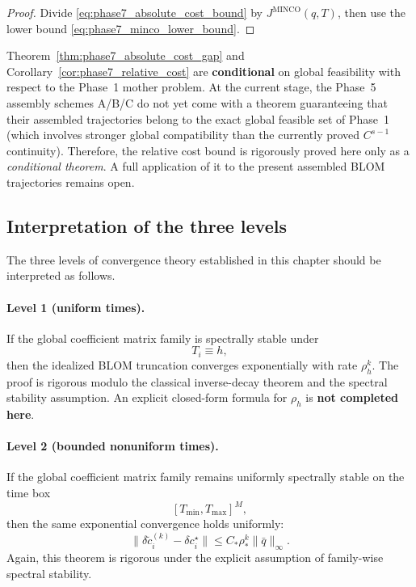 \begin{proof}
	Divide \eqref{eq:phase7_absolute_cost_bound} by \(J^{\mathrm{MINCO}}(q,T)\), then use the lower bound \eqref{eq:phase7_minco_lower_bound}.
\end{proof}

\begin{remark}
	\label{rem:phase7_cost_limitation}
	Theorem~\ref{thm:phase7_absolute_cost_gap} and Corollary~\ref{cor:phase7_relative_cost} are \textbf{conditional} on global feasibility with respect to the Phase~1 mother problem.
	At the current stage, the Phase~5 assembly schemes A/B/C do not yet come with a theorem guaranteeing that their assembled trajectories belong to the exact global feasible set of Phase~1 (which involves stronger global compatibility than the currently proved \(C^{s-1}\) continuity).
	Therefore, the relative cost bound is rigorously proved here only as a \emph{conditional theorem}.
	A full application of it to the present assembled BLOM trajectories remains open.
\end{remark}

\subsection{Interpretation of the three levels}
\label{subsec:phase7_interpretation}

The three levels of convergence theory established in this chapter should be interpreted as follows.

\paragraph{Level 1 (uniform times).}
If the global coefficient matrix family is spectrally stable under
\[
T_i\equiv h,
\]
then the idealized BLOM truncation converges exponentially with rate \(\rho_h^k\).
The proof is rigorous modulo the classical inverse-decay theorem and the spectral stability assumption.
An explicit closed-form formula for \(\rho_h\) is \textbf{not completed here}.

\paragraph{Level 2 (bounded nonuniform times).}
If the global coefficient matrix family remains uniformly spectrally stable on the time box
\[
[T_{\min},T_{\max}]^M,
\]
then the same exponential convergence holds uniformly:
\[
\bigl\|
\delta \tilde c_i^{(k)}-\delta c_i^\star
\bigr\|
\le
C_\ast \rho_\ast^k \|\bar q\|_\infty.
\]
Again, this theorem is rigorous under the explicit assumption of family-wise spectral stability.

